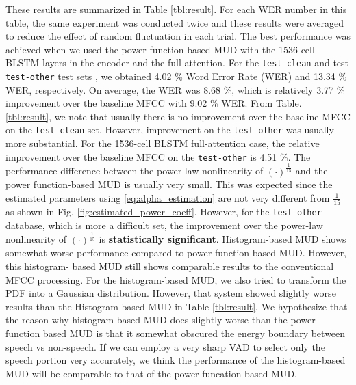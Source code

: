 \documentclass[a4paper]{article}
\begin{document}
These results are summarized in Table \ref{tbl:result}. For
each WER number in this table, the same experiment was conducted twice and 
these results were averaged to reduce the effect of random fluctuation
in each trial.
The best 
performance was achieved when we used the power function-based MUD with 
the 1536-cell BLSTM layers in the encoder and the full attention.
For the {\tt test-clean} and test {\tt test-other} test sets
\cite{v_panayotov_icassp_2015_00} , we 
obtained 4.02 \% Word Error Rate (WER) and 13.34 \% WER, respectively.
On average, the WER was 8.68 \%, which is relatively 3.77 \% improvement   
over the baseline MFCC with 9.02 \% WER.
From Table. \ref{tbl:result},
we note that usually there is no improvement over the baseline MFCC on
the {\tt test-clean} set. However, improvement on the {\tt test-other}
was usually more substantial. For the 1536-cell BLSTM full-attention case,
the relative improvement over the baseline MFCC on the {\tt test-other} 
is 4.51 \%.
 The performance difference between
the power-law nonlinearity of $(\cdot)^{\frac{1}{15}}$ and the power
function-based MUD is usually very small. This was expected since
the estimated parameters using \eqref{eq:alpha_estimation} are not
very different from $\frac{1}{15}$ as shown in Fig.
\ref{fig:estimated_power_coeff}.  However, for the {\tt test-other}
database, which is more a difficult set, the improvement over 
the power-law nonlinearity of $(\cdot)^{\frac{1}{15}}$ is {\bf statistically
significant}.
Histogram-based MUD shows somewhat worse 
performance compared to power function-based MUD. However, this histogram-
based MUD still shows comparable results to the conventional MFCC processing.
For the histogram-based MUD, we also tried to transform the PDF into a Gaussian
distribution. However, that system showed slightly worse results than the 
Histogram-based MUD in Table \ref{tbl:result}.
We hypothesize that the reason why histogram-based MUD does slightly worse
than the power-function based MUD is that it somewhat obscured the
energy boundary between speech vs non-speech. If we can employ a very sharp VAD
to select only the speech portion very accurately, we think the performance
of the histogram-based MUD will be comparable to that of the power-funcation
based MUD.


%
%
%
\end{document}

